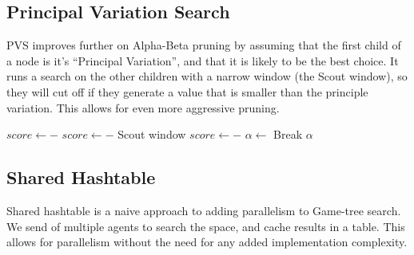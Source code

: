 \documentclass[]{article}
\begin{document}
\subsection{Principal Variation Search}
PVS improves further on Alpha-Beta pruning by assuming that the first child of a node
is it's ``Principal Variation'', and that it is likely to be the best choice. It runs a
search on the other children with a narrow window (the Scout window), so they will cut off if they generate
a value that is smaller than the principle variation. This allows for even more aggressive
pruning.
\begin{algorithmic}[1]
  \State \Return {}
  \Else
  \State $score \gets -$ 
  \Else
  \State $score \gets -$ 
  \Comment Scout window
  \EndIf
    \State $score \gets -$ 
  \EndIf
  \State $\alpha \gets $ 
  \If{$\alpha \geq \beta$}
  \State Break
  \EndIf
  \EndFor
  \State \Return $\alpha$
  \EndIf
  \EndProcedure
\end{algorithmic}

\subsection{Shared Hashtable}
Shared hashtable is a naive approach to adding parallelism to Game-tree search. We send of multiple agents
to search the space, and cache results in a table. This allows for parallelism without the need for any added
implementation complexity.
\end{document}
